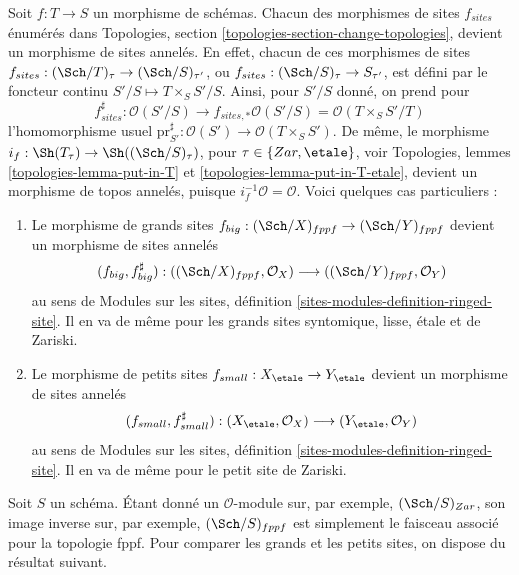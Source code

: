 \begin{remark}
\label{remark-change-topologies-ringed}
Soit $f : T \to S$ un morphisme de schémas.
Chacun des morphismes de sites $f_{sites}$ énumérés dans
Topologies, section \ref{topologies-section-change-topologies},
devient un morphisme de sites annelés. En effet, chacun de ces morphismes de sites
$f_{sites} : (\Sch/T)_\tau \to (\Sch/S)_{\tau'}$, ou
$f_{sites} : (\Sch/S)_\tau \to S_{\tau'}$, est défini par le foncteur
continu $S'/S \mapsto T \times_S S'/S$. Ainsi, pour $S'/S$ donné, on prend pour
$$
f_{sites}^\sharp :
\mathcal{O}(S'/S)
\longrightarrow
f_{sites, *}\mathcal{O}(S'/S) =
\mathcal{O}(T \times_S S'/T)
$$
l'homomorphisme usuel
$\text{pr}_{S'}^\sharp : \mathcal{O}(S') \to \mathcal{O}(T \times_S S')$.
De même, le morphisme
$i_f : \Sh(T_\tau) \to \Sh((\Sch/S)_\tau)$,
pour $\tau \in \{Zar, \etale\}$, voir
Topologies, lemmes \ref{topologies-lemma-put-in-T} et
\ref{topologies-lemma-put-in-T-etale},
devient un morphisme de topos annelés, puisque $i_f^{-1}\mathcal{O} = \mathcal{O}$.
Voici quelques cas particuliers :
\begin{enumerate}
\item Le morphisme de grands sites
$f_{big} : (\Sch/X)_{fppf} \to (\Sch/Y)_{fppf}$
devient un morphisme de sites annelés
$$
(f_{big}, f_{big}^\sharp) :
((\Sch/X)_{fppf}, \mathcal{O}_X)
\longrightarrow
((\Sch/Y)_{fppf}, \mathcal{O}_Y)
$$
au sens de Modules sur les sites, définition \ref{sites-modules-definition-ringed-site}.
Il en va de même pour les grands sites syntomique, lisse, \'etale et de Zariski.
\item Le morphisme de petits sites
$f_{small} : X_\etale \to Y_\etale$
devient un morphisme de sites annelés
$$
(f_{small}, f_{small}^\sharp) :
(X_\etale, \mathcal{O}_X)
\longrightarrow
(Y_\etale, \mathcal{O}_Y)
$$
au sens de Modules sur les sites, définition \ref{sites-modules-definition-ringed-site}.
Il en va de même pour le petit site de Zariski.
\end{enumerate}
\end{remark}

\noindent
Soit $S$ un schéma. Étant donné un $\mathcal{O}$-module sur, par exemple,
$(\Sch/S)_{Zar}$, son image inverse sur, par exemple, $(\Sch/S)_{fppf}$
est simplement le faisceau associé pour la topologie fppf. Pour comparer
les grands et les petits sites, on dispose du résultat suivant.

